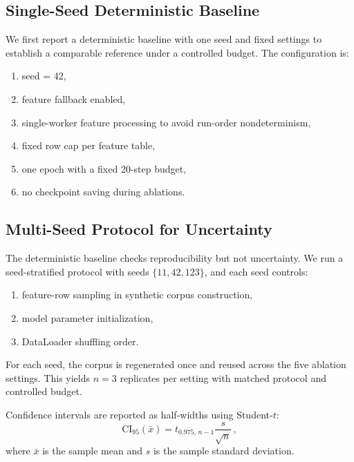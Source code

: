\documentclass[journal]{IEEEtran}
\begin{document}
\subsection{Single-Seed Deterministic Baseline}
We first report a deterministic baseline with one seed and fixed settings to establish a comparable reference under a controlled budget. The configuration is:
\begin{enumerate}
    \item seed = 42,
    \item feature fallback enabled,
    \item single-worker feature processing to avoid run-order nondeterminism,
    \item fixed row cap per feature table,
    \item one epoch with a fixed 20-step budget,
    \item no checkpoint saving during ablations.
\end{enumerate}

\subsection{Multi-Seed Protocol for Uncertainty}
The deterministic baseline checks reproducibility but not uncertainty. We run a seed-stratified protocol with seeds $\{11,42,123\}$, and each seed controls:
\begin{enumerate}
    \item feature-row sampling in synthetic corpus construction,
    \item model parameter initialization,
    \item DataLoader shuffling order.
\end{enumerate}

For each seed, the corpus is regenerated once and reused across the five ablation settings. This yields $n=3$ replicates per setting with matched protocol and controlled budget.

Confidence intervals are reported as half-widths using Student-$t$:
\begin{equation}
\mathrm{CI}_{95}(\bar{x}) = t_{0.975,\,n-1}\frac{s}{\sqrt{n}}\,,
\label{eq:ci95}
\end{equation}
where $\bar{x}$ is the sample mean and $s$ is the sample standard deviation.
\end{document}
